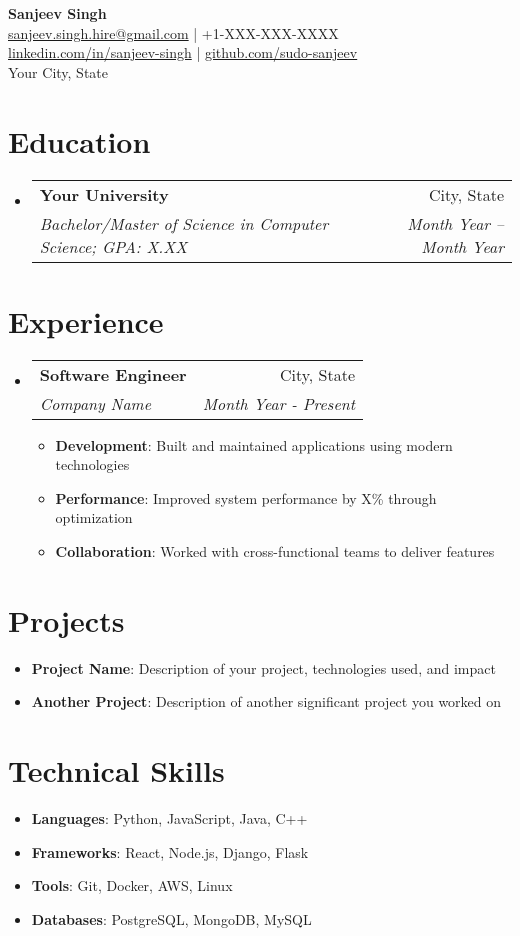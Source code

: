 \documentclass[11pt,letterpaper]{article}
\makeatletter
\newcommand{\resumeItem}[2]{
  \item\small{
    \textbf{#1}{: #2 \vspace{-2pt}}
  }
}
\newcommand{\resumeSubheading}[4]{
  \vspace{-1pt}\item
    \begin{tabular*}{\textwidth}{l@{\extracolsep{\fill}}r}
      \textbf{#1} & #2 \\
      \textit{\small#3} & \textit{\small #4} \\
    \end{tabular*}\vspace{-5pt}
}
\newcommand{\resumeSubItem}[2]{\resumeItem{#1}{#2}\vspace{-4pt}}
\newcommand{\resumeSubHeadingListStart}{\begin{itemize}[leftmargin=*]}
\newcommand{\resumeSubHeadingListEnd}{\end{itemize}}
\newcommand{\resumeItemListStart}{\begin{itemize}}
\newcommand{\resumeItemListEnd}{\end{itemize}\vspace{-5pt}}
\makeatother
\begin{document}
\begin{center}
    {\Large \textbf{Sanjeev Singh}} \\
    \vspace{5pt}
    \href{mailto:sanjeev.singh.hire@gmail.com}{sanjeev.singh.hire@gmail.com} | +1-XXX-XXX-XXXX \\
    \href{https://linkedin.com/in/sanjeev-singh}{linkedin.com/in/sanjeev-singh} | \href{https://github.com/sudo-sanjeev}{github.com/sudo-sanjeev} \\
    Your City, State
\end{center}

\section{Education}
  \resumeSubHeadingListStart
    \resumeSubheading
      {Your University}{City, State}
      {Bachelor/Master of Science in Computer Science;  GPA: X.XX}{Month Year -- Month Year}
  \resumeSubHeadingListEnd

\section{Experience}
  \resumeSubHeadingListStart
    \resumeSubheading
      {Software Engineer}{City, State}
      {Company Name}{Month Year - Present}
      \resumeItemListStart
        \resumeItem{Development}
          {Built and maintained applications using modern technologies}
        \resumeItem{Performance}
          {Improved system performance by X\% through optimization}
        \resumeItem{Collaboration}
          {Worked with cross-functional teams to deliver features}
      \resumeItemListEnd
  \resumeSubHeadingListEnd

\section{Projects}
  \resumeSubHeadingListStart
    \resumeSubItem{Project Name}
      {Description of your project, technologies used, and impact}
    \resumeSubItem{Another Project}
      {Description of another significant project you worked on}
  \resumeSubHeadingListEnd

\section{Technical Skills}
  \resumeSubHeadingListStart
    \item{
      \textbf{Languages}: Python, JavaScript, Java, C++
    }
    \item{
      \textbf{Frameworks}: React, Node.js, Django, Flask
    }
    \item{
      \textbf{Tools}: Git, Docker, AWS, Linux
    }
    \item{
      \textbf{Databases}: PostgreSQL, MongoDB, MySQL
    }
  \resumeSubHeadingListEnd
\end{document}
